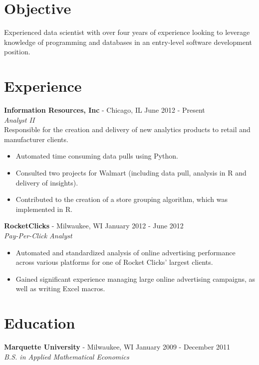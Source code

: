 \documentclass[margin]{res}
\begin{document}
\address{Chicago, IL 60640\\  (847) 909-6486}
\address{www.rhostats.com\\ mrhodes262@gmail.com}


\begin{resume}

\section{Objective} Experienced data scientist with over four years of experience looking to leverage knowledge of programming and databases in an entry-level software development position.

\section{Experience}
 {\bf Information Resources, Inc} - Chicago, IL \hfill June 2012 - Present\\
 \textit{Analyst II}\\
 {Responsible for the creation and delivery of new analytics products to retail and manufacturer clients.}
 
 \begin{itemize} \itemsep -2pt  %
	\item Automated time consuming data pulls using Python.
 	\item Consulted two projects for Walmart (including data pull, analysis in R and delivery of insights).
 	\item Contributed to the creation of a store grouping algorithm, which was implemented in R.
 \end{itemize}
 
 {\bf RocketClicks} - Milwaukee, WI \hfill January 2012 - June 2012\\
 \textit{Pay-Per-Click Analyst}
 \begin{itemize} \itemsep -2pt  %
 	\item Automated and standardized analysis of online advertising performance across various
platforms for one of Rocket Clicks' largest clients.
 	\item Gained significant experience managing large online advertising campaigns, as well as
writing Excel macros.
 \end{itemize}
 
\section{Education} 
\textbf{Marquette University} - Milwaukee, WI \hfill January 2009 - December 2011 \\
\textit{B.S. in Applied Mathematical Economics}


\end{resume}
\end{document}
